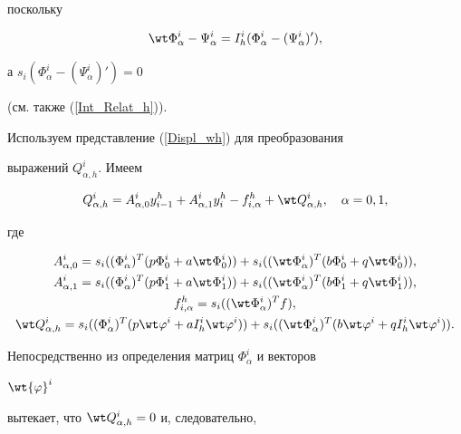 поскольку


$$


\wt \Phi_\alpha^i-\Psi_\alpha^i =


I_h^i (\Phi_\alpha^i-(\Psi_\alpha^i)'),


$$


а $s_i(\Phi_\alpha^i-(\Psi_\alpha^i)')=0$


(см. также (\ref{Int_Relat_h})).


Используем представление (\ref{Displ_wh}) для преобразования


выражений $Q_{\alpha,h}^i$. Имеем


$$


Q_{\alpha,h}^i=A_{\alpha,0}^i y_{i-1}^h+A_{\alpha,1}^i y_i^h -


f_{i,\alpha}^{h} +\wt Q_{\alpha,h}^i, \quad \alpha=0,1,


$$


где


\begin{gather*}


A_{\alpha,0}^i=


s_i((\Phi_\alpha^i)^T (p\Phi_0^i+a\wt \Phi_0^i)) +


s_i((\wt \Phi_\alpha^i)^T (b\Phi_0^i+q\wt \Phi_0^i)), \\


%


A_{\alpha,1}^i=s_i((\Phi_\alpha^i)^T (p\Phi_1^i+a\wt \Phi_1^i))


+ s_i((\wt \Phi_\alpha^i)^T (b\Phi_1^i+q\wt \Phi_1^i)), \\


%


f_{i,\alpha}^{h}= s_i((\wt \Phi_\alpha^i)^T f), \\


%


\wt Q_{\alpha,h}^i=s_i((\Phi_\alpha^i)^T (p\wt \varphi^i


+ aI_h^i \wt \varphi^i))


+s_i((\wt \Phi_\alpha^i)^T (b\wt \varphi^i +


qI_h^i \wt \varphi^i)).


\end{gather*}


Непосредственно из определения матриц $\Phi_\alpha^i$ и векторов


$\wt{\varphi}^i$


вытекает, что $\wt Q_{\alpha,h}^i =0$ и, следовательно,


$$


